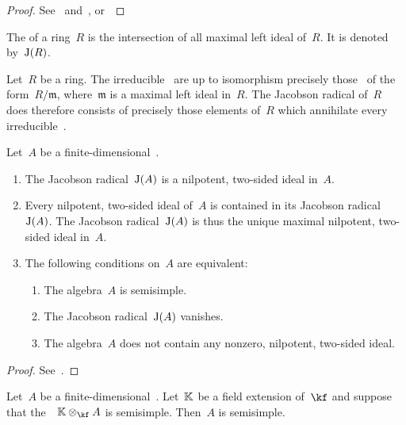 \documentclass[a4paper, 11pt, oneside]{scrartcl}
\begin{document}
\begin{proof}
  See~\cite[XVII,~\S5,~Proposition~4.7]{lang_algebra} and~\cite{stackexchange_lang_proof}, or~\cite[Proposition~5.13]{milne_lag}
\end{proof}

\begin{definition}
  The  of a ring~$R$ is the intersection of all maximal left ideal of~$R$.
  It is denoted by~$\operatorname{J}(R)$.
\end{definition}

\begin{remark}
  Let~$R$ be a ring.
  The irreducible~ are up to isomorphism precisely those~ of the form~$R/\mathfrak{m}$, where~$\mathfrak{m}$ is a maximal left ideal in~$R$.
  The Jacobson radical of~$R$ does therefore consists of precisely those elements of~$R$ which annihilate every irreducible~.
\end{remark}

\begin{proposition}
  Let~$A$ be a finite-dimensional~\algebra{$\kf$}.
  \begin{enumerate}
    \item
      The Jacobson radical~$\operatorname{J}(A)$ is a nilpotent, two-sided ideal in~$A$.
    \item
      Every nilpotent, two-sided ideal of~$A$ is contained in its Jacobson radical~$\operatorname{J}(A)$.
      The Jacobson radical~$\operatorname{J}(A)$ is thus the unique maximal nilpotent, two-sided ideal in~$A$.
    \item
      The following conditions on~$A$ are equivalent:
      \begin{enumerate}[label = \roman*.]
        \item
          The algebra~$A$ is semisimple.
        \item
          The Jacobson radical~$\operatorname{J}(A)$ vanishes.
        \item
          The algebra~$A$ does not contain any nonzero, nilpotent, two-sided ideal.
      \end{enumerate}
  \end{enumerate}
\end{proposition}

\begin{proof}
  See~\cite[\S4]{lam_first_course}.
\end{proof}

\begin{corollary}
  \label{extension of scalars for algebras reflect semisimple}
  Let~$A$ be a finite-dimensional~\algebra{$\kf$}.
  Let~$\Kf$ be a field extension of~$\kf$ and suppose that the~\algebra{$\Kf$}~$\Kf \tensor_{\kf} A$ is semisimple.
  Then~$A$ is semisimple.
\end{corollary}
\end{document}
